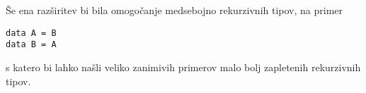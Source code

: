 \documentclass[12pt,a4paper,openany]{book}
\begin{document}
Še ena razširitev bi bila omogočanje medsebojno rekurzivnih tipov, na primer 
\begin{lstlisting}
data A = B
data B = A
\end{lstlisting}
s katero bi lahko našli veliko zanimivih primerov malo bolj zapletenih rekurzivnih tipov.

\newpage


\appendix

\newpage

\label{stran_literatura}
 

\end{document}
